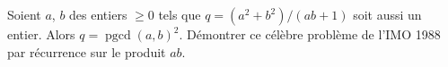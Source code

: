Soient $a$, $b$ des entiers $\geq 0$ tels que $q = (a^2 + b^2)/(ab + 1)$ soit aussi un entier. Alors $q = \operatorname{pgcd}(a,b)^2$. Démontrer ce célèbre problème de l'IMO 1988 par récurrence sur le produit $ab$.

